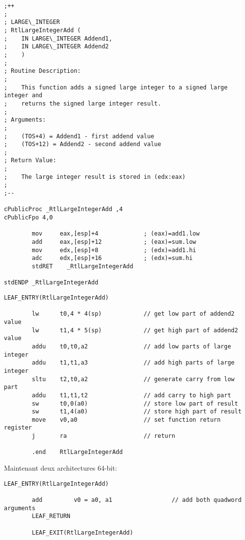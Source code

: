 \begin{lstlisting}[style=customasmx86,caption=i386 arch]
;++
;
; LARGE\_INTEGER
; RtlLargeIntegerAdd (
;    IN LARGE\_INTEGER Addend1,
;    IN LARGE\_INTEGER Addend2
;    )
;
; Routine Description:
;
;    This function adds a signed large integer to a signed large integer and
;    returns the signed large integer result.
;
; Arguments:
;
;    (TOS+4) = Addend1 - first addend value
;    (TOS+12) = Addend2 - second addend value
;
; Return Value:
;
;    The large integer result is stored in (edx:eax)
;
;--

cPublicProc _RtlLargeIntegerAdd ,4
cPublicFpo 4,0

        mov     eax,[esp]+4             ; (eax)=add1.low
        add     eax,[esp]+12            ; (eax)=sum.low
        mov     edx,[esp]+8             ; (edx)=add1.hi
        adc     edx,[esp]+16            ; (edx)=sum.hi
        stdRET    _RtlLargeIntegerAdd

stdENDP _RtlLargeIntegerAdd
\end{lstlisting}

\begin{lstlisting}[caption=MIPS arch]
        LEAF_ENTRY(RtlLargeIntegerAdd)

        lw      t0,4 * 4(sp)            // get low part of addend2 value
        lw      t1,4 * 5(sp)            // get high part of addend2 value
        addu    t0,t0,a2                // add low parts of large integer
        addu    t1,t1,a3                // add high parts of large integer
        sltu    t2,t0,a2                // generate carry from low part
        addu    t1,t1,t2                // add carry to high part
        sw      t0,0(a0)                // store low part of result
        sw      t1,4(a0)                // store high part of result
        move    v0,a0                   // set function return register
        j       ra                      // return

        .end    RtlLargeIntegerAdd
\end{lstlisting}

Maintenant deux architectures 64-bit:

\begin{lstlisting}[caption=Itanium arch]
        LEAF_ENTRY(RtlLargeIntegerAdd)

        add         v0 = a0, a1                 // add both quadword arguments
        LEAF_RETURN

        LEAF_EXIT(RtlLargeIntegerAdd)
\end{lstlisting}

